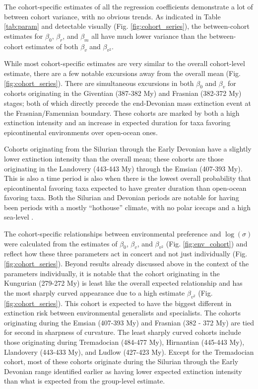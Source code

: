\documentclass{article}
\begin{document}
The cohort-specific estimates of all the regression coefficients demonstrate a lot of between cohort variance, with no obvious trends. As indicated in Table \ref{tab:param} and detectable visually (Fig. \ref{fig:cohort_series}), the between-cohort estimates for \(\beta_{0}\), \(\beta_{r}\), and \(\beta_{m}\) all have much lower variance than the between-cohort estimates of both \(\beta_{v}\) and \(\beta_{v^{2}}\).

While most cohort-specific estimates are very similar to the overall cohort-level estimate, there are a few notable excursions away from the overall mean (Fig. \ref{fig:cohort_series}). There are simultaneous excursions in both \(\beta_{0}\) and \(\beta_{v}\) for cohorts originating in the Giventian (387-382 My) and Frasnian (382-372 My) stages; both of which directly precede the end-Devonian mass extinction event at the Frasnian/Famennian boundary. These cohorts are marked by both a high extinction intensity and an increase in expected duration for taxa favoring epicontinental environments over open-ocean ones.

Cohorts originating from the Silurian through the Early Devonian have a slightly lower extinction intensity than the overall mean; these cohorts are those originating in the Landovery (443-443 My) through the Emsian (407-393 My). This is also a time period is also when there is the lowest overall probability that epicontinental favoring taxa expected to have greater duration than open-ocean favoring taxa. Both the Silurian and Devonian periods are notable for having been periods with a mostly ``hothouse'' climate, with no polar icecaps and a high sea-level \citep{Edwards1985,Joachimski2009,Munnecke2010}.

The cohort-specific relationships between environmental preference and \(\log(\sigma)\) were calculated from the estimates of \(\beta_{0}\), \(\beta_{v}\), and \(\beta_{v^{2}}\) (Fig. \ref{fig:env_cohort}) and reflect how these three parameters act in concert and not just individually (Fig. \ref{fig:cohort_series}). Beyond results already discussed above in the context of the parameters individually, it is notable that the cohort originating in the Kungurian (279-272 My) is least like the overall expected relationship and has the most sharply curved appearance due to a high estimate \(\beta_{v^{2}}\) (Fig. \ref{fig:cohort_series}). This cohort is expected to have the biggest different in extinction risk between environmental generalists and specialists. The cohorts originating during the Emsian (407-393 My) and Frasnian (382 - 372 My) are tied for second in sharpness of curvature. The least sharply curved cohorts include those originating during Tremadocian (484-477 My), Hirnantian (445-443 My), Llandovery (443-433 My), and Ludlow (427-423 My). Except for the Tremadocian cohort, most of these cohorts originate during the Silurian through the Early Devonian range identified earlier as having lower expected extinction intensity than what is expected from the group-level estimate.
\end{document}
